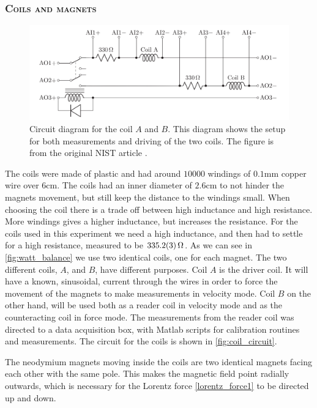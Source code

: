 \documentclass[english,a4paper,12pt,reprint]{revtex4-1}
\begin{document}
\subsubsection{\textsc{Coils and magnets}}
\begin{figure}
  \centering
  \includegraphics[scale=0.30]{coil_circuit.png}
  \caption{Circuit diagram for the coil $A$ and $B$. This diagram shows the setup for both measurements and driving of the two coils. The figure is from the original NIST article \cite{chao_lego_2015}.}
  \label{fig:coil_circuit}
\end{figure}
The coils were made of plastic and had around $10 000$ windings of $0.1$mm copper wire over $6$cm. The coils had an inner diameter of $2.6$cm to not hinder the magnets movement, but still keep the distance to the windings small. When choosing the coil there is a trade off between high inductance and high resistance. More windings gives a higher inductance, but increases the resistance. For the coils used in this experiment we need a high inductance, and then had to settle for a high resistance, measured to be $\SI{335.2\pm0.3}{\ohm}$. As we can see in \vref{fig:watt_balance} we use two identical coils, one for each magnet. The two different coils, $A$, and $B$, have different purposes. Coil $A$ is the driver coil. It will have a known, sinusoidal, current through the wires in order to force the movement of the magnets to make measurements in velocity mode. Coil $B$ on the other hand, will be used both as a reader coil in velocity mode and as the counteracting coil in force mode. The measurements from the reader coil was directed to a data acquisition box, with Matlab scripts for calibration routines and measurements. The circuit for the coils is shown in \vref{fig:coil_circuit}. \par
The neodymium magnets moving inside the coils are two identical magnets facing each other with the same pole. This makes the magnetic field point radially outwards, which is necessary for the Lorentz force \eqref{lorentz_force1} to be directed up and down.
\end{document}
